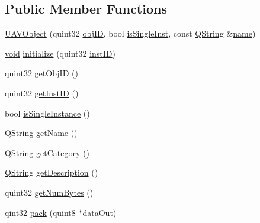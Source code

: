 \subsection*{\-Public \-Member \-Functions}
\begin{DoxyCompactItemize}
\item 
\hyperlink{group___u_a_v_objects_plugin_gafee3b68612b44afbe6dd82f663126f09}{\-U\-A\-V\-Object} (quint32 \hyperlink{group___u_a_v_objects_plugin_gafc50acdaa311c9fd9aaddf90fd578c14}{obj\-I\-D}, bool \hyperlink{group___u_a_v_objects_plugin_gaa279cad3a000cc930e7f386672426bcb}{is\-Single\-Inst}, const \hyperlink{group___u_a_v_objects_plugin_gab9d252f49c333c94a72f97ce3105a32d}{\-Q\-String} \&\hyperlink{group___u_a_v_objects_plugin_gadf898ed0961464f4a3f8e05fb28019f5}{name})
\item 
\hyperlink{group___u_a_v_objects_plugin_ga444cf2ff3f0ecbe028adce838d373f5c}{void} \hyperlink{group___u_a_v_objects_plugin_ga1ed2d21fdcea1cc31ebc6c669ba49720}{initialize} (quint32 \hyperlink{group___u_a_v_objects_plugin_gad8d656542a04e9fbef607ff178f6d9d3}{inst\-I\-D})
\item 
quint32 \hyperlink{group___u_a_v_objects_plugin_gaad45ab83a511083bfe60df0c244e9b88}{get\-Obj\-I\-D} ()
\item 
quint32 \hyperlink{group___u_a_v_objects_plugin_gaf465e2bde7a1e41ba94c19eac2ba9b80}{get\-Inst\-I\-D} ()
\item 
bool \hyperlink{group___u_a_v_objects_plugin_gac05d3c2bd0fd07947707562f66ddfc18}{is\-Single\-Instance} ()
\item 
\hyperlink{group___u_a_v_objects_plugin_gab9d252f49c333c94a72f97ce3105a32d}{\-Q\-String} \hyperlink{group___u_a_v_objects_plugin_ga92eb502fc16ba82b924a430acaa55f46}{get\-Name} ()
\item 
\hyperlink{group___u_a_v_objects_plugin_gab9d252f49c333c94a72f97ce3105a32d}{\-Q\-String} \hyperlink{group___u_a_v_objects_plugin_gae829aa2dbab661a65f9f805caa8c67d1}{get\-Category} ()
\item 
\hyperlink{group___u_a_v_objects_plugin_gab9d252f49c333c94a72f97ce3105a32d}{\-Q\-String} \hyperlink{group___u_a_v_objects_plugin_ga319c487a42b628a2e83274c89fa77625}{get\-Description} ()
\item 
quint32 \hyperlink{group___u_a_v_objects_plugin_gafa1288a7ab0b65c3f81c4312d7cfee78}{get\-Num\-Bytes} ()
\item 
qint32 \hyperlink{group___u_a_v_objects_plugin_ga4afcaf928b2868be5a57d96a2b251318}{pack} (quint8 $\ast$data\-Out)
\item 

\end{DoxyCompactItemize}
